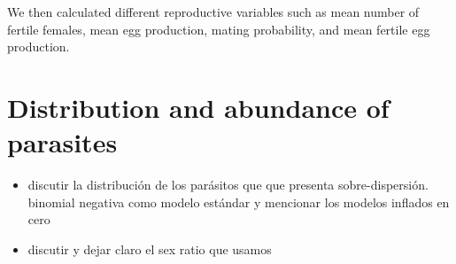 \documentclass[12pt,a4paper]{article}
\theoremstyle{plain}%
\theoremstyle{definition}
\theoremstyle{remark}
\begin{document}
	
	We then calculated different reproductive variables such as mean number of fertile females, mean egg production, mating probability, and mean fertile egg production.
	
	
	
	
%	

\section{Distribution and abundance of parasites}
\begin{itemize}
	\item discutir la distribución de los parásitos que que presenta sobre-dispersión. binomial negativa como modelo estándar y mencionar los modelos inflados en cero  
	\item discutir y dejar claro el sex ratio que usamos
\end{itemize}
\end{document}
